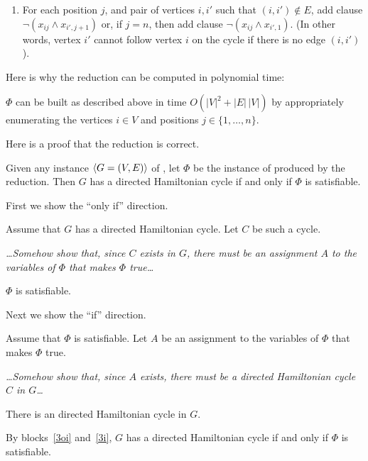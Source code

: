 \documentclass[11pt]{article}
\begin{document}
\begin{problems}
\begin{enumerate}
  \item For each position $j$, and pair of vertices $i, i'$ such that $(i,i')\not\in E$,
    add clause $\neg (x_{ij} \wedge x_{i',j+1})$
    or, if $j=n$, then add clause  $\neg (x_{ij} \wedge x_{i',1})$.
    (In other words, vertex $i'$ cannot follow vertex $i$ on the cycle
    if there is no edge $(i,i')$).
  \end{enumerate}
  
  \lineacross 

  \medskip 
  Here is why the reduction can be computed in polynomial time:
  
  \lineacross 
  
  $\Phi$ can be built as described above in time $O(|V|^2 + |E|\,|V|)$
  by appropriately enumerating the vertices $i\in V$ and positions $j\in\{1,\ldots,n\}$.

  \lineacross 

  \medskip 
  Here is a proof that the reduction is correct.
  \begin{lemma}
    Given any instance $\langle G=(V,E) \rangle$ of ,
    let $\Phi$ be the instance of  produced by the reduction.
    Then $G$ has a directed Hamiltonian cycle 
    if and only if $\Phi$ is satisfiable.
  \end{lemma}
  \begin{longFormProof}
    \step First we show the ``only if'' direction.
    \begin{block}[3oi]
      {Assume that $G$ has a directed Hamiltonian cycle.}
      \step Let $C$ be such a cycle.
      \smallskip 

      \emph{\ldots Somehow show that, since $C$ exists in $G$,
        there must be an assignment $A$ to the variables of $\Phi$
        that makes $\Phi$ true\ldots}

      \smallskip 
      \step $\Phi$ is satisfiable.
    \end{block} 
    \step Next we show the ``if'' direction.
    \begin{block}[3i]
      {Assume that $\Phi$ is satisfiable.}
      \step Let $A$ be an assignment to the variables of $\Phi$ that makes $\Phi$ true.
      \smallskip 
      
      \emph{\ldots Somehow show that, since $A$ exists,
        there must be a directed Hamiltonian cycle $C$ in $G$\ldots}

      \smallskip 
      \step There is an directed Hamiltonian cycle in $G$.
    \end{block} 
    \step By blocks~\ref{3oi} and~\ref{3i},
    $G$ has a directed Hamiltonian cycle
    if and only if $\Phi$ is satisfiable.
  \end{longFormProof}


\end{problems}
\end{document}
